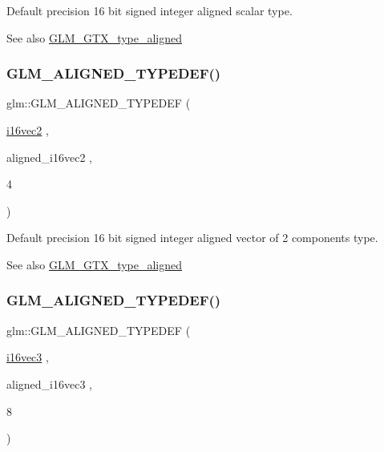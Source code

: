 Default precision 16 bit signed integer aligned scalar type. \begin{DoxySeeAlso}{See also}
\mbox{\hyperlink{group__gtx__type__aligned}{G\+L\+M\+\_\+\+G\+T\+X\+\_\+type\+\_\+aligned}} 
\end{DoxySeeAlso}
\mbox{\label{group__gtx__type__aligned_ga9d7cb211ccda69b1c22ddeeb0f3e7aba}} 
\subsubsection{\texorpdfstring{GLM\_ALIGNED\_TYPEDEF()}{GLM\_ALIGNED\_TYPEDEF()}\hspace{0.1cm}{\footnotesize\ttfamily [58/209]}}
{\footnotesize\ttfamily glm\+::\+G\+L\+M\+\_\+\+A\+L\+I\+G\+N\+E\+D\+\_\+\+T\+Y\+P\+E\+D\+EF (\begin{DoxyParamCaption}\item[{\mbox{\hyperlink{group__gtc__type__precision_ga37af364ff13fb791571dd324dfd3ca89}{i16vec2}}}]{,  }\item[{aligned\+\_\+i16vec2}]{,  }\item[{4}]{ }\end{DoxyParamCaption})}

Default precision 16 bit signed integer aligned vector of 2 components type. \begin{DoxySeeAlso}{See also}
\mbox{\hyperlink{group__gtx__type__aligned}{G\+L\+M\+\_\+\+G\+T\+X\+\_\+type\+\_\+aligned}} 
\end{DoxySeeAlso}
\mbox{\label{group__gtx__type__aligned_gaaee91dd2ab34423bcc11072ef6bd0f02}} 
\subsubsection{\texorpdfstring{GLM\_ALIGNED\_TYPEDEF()}{GLM\_ALIGNED\_TYPEDEF()}\hspace{0.1cm}{\footnotesize\ttfamily [59/209]}}
{\footnotesize\ttfamily glm\+::\+G\+L\+M\+\_\+\+A\+L\+I\+G\+N\+E\+D\+\_\+\+T\+Y\+P\+E\+D\+EF (\begin{DoxyParamCaption}\item[{\mbox{\hyperlink{group__gtc__type__precision_ga85e903f028d903b416a1119b00af57ea}{i16vec3}}}]{,  }\item[{aligned\+\_\+i16vec3}]{,  }\item[{8}]{ }\end{DoxyParamCaption})}

